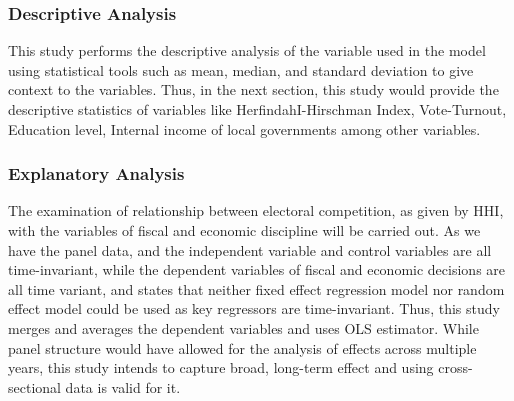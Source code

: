 \subsubsection{Descriptive Analysis}
This study performs the descriptive analysis of the variable used in the model using statistical tools such as mean, median, and standard deviation to give context to the variables. Thus, in the next section, this study would provide the descriptive statistics of variables like HerfindahI-Hirschman Index, Vote-Turnout, Education level, Internal income of local governments among other variables.
\subsubsection{Explanatory Analysis}
The examination of relationship between electoral competition, as given by HHI, with the variables of fiscal and economic discipline will be carried out. As we have the panel data, and the independent variable and control variables are all time-invariant, while the dependent variables of fiscal and economic decisions are all time variant,  and  states that neither fixed effect regression model nor random effect model could be used as key regressors are time-invariant. Thus, this study merges and averages the dependent variables and uses OLS estimator. While panel structure would have allowed for the analysis of effects across multiple years, this study intends to capture broad, long-term effect and using cross-sectional data is valid for it.
\vspace{-4mm}
